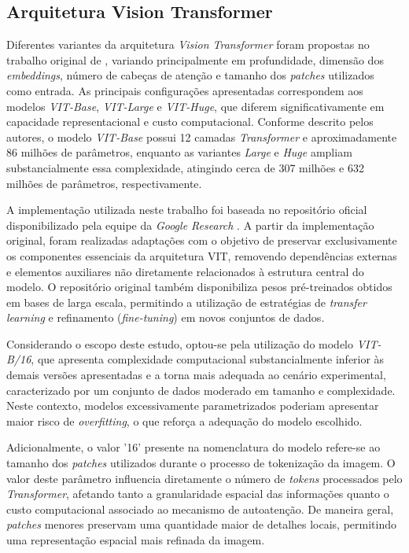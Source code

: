 \subsection{Arquitetura Vision Transformer}

Diferentes variantes da arquitetura \textit{Vision Transformer} foram propostas no trabalho original de \cite{dosovitskiy2020vit}, variando principalmente em profundidade, dimensão dos \textit{embeddings}, número de cabeças de atenção e tamanho dos \textit{patches} utilizados como entrada. As principais configurações apresentadas correspondem aos modelos \textit{\acs{VIT}-Base}, \textit{\acs{VIT}-Large} e \textit{\acs{VIT}-Huge}, que diferem significativamente em capacidade representacional e custo computacional. Conforme descrito pelos autores, o modelo \textit{\acs{VIT}-Base} possui 12 camadas \textit{Transformer} e aproximadamente 86 milhões de parâmetros, enquanto as variantes \textit{Large} e \textit{Huge} ampliam substancialmente essa complexidade, atingindo cerca de 307 milhões e 632 milhões de parâmetros, respectivamente.

A implementação utilizada neste trabalho foi baseada no repositório oficial disponibilizado pela equipe da \textit{Google Research} \cite{vision_transformer_google}. A partir da implementação original, foram realizadas adaptações com o objetivo de preservar exclusivamente os componentes essenciais da arquitetura \acs{VIT}, removendo dependências externas e elementos auxiliares não diretamente relacionados à estrutura central do modelo. O repositório original também disponibiliza pesos pré-treinados obtidos em bases de larga escala, permitindo a utilização de estratégias de \textit{transfer learning} e refinamento (\textit{fine-tuning}) em novos conjuntos de dados.

Considerando o escopo deste estudo, optou-se pela utilização do modelo \textit{\acs{VIT}-B/16}, que apresenta complexidade computacional substancialmente inferior às demais versões apresentadas e a torna mais adequada ao cenário experimental, caracterizado por um conjunto de dados moderado em tamanho e complexidade. Neste contexto, modelos excessivamente parametrizados poderiam apresentar maior risco de \textit{overfitting}, o que reforça a adequação do modelo escolhido. 

Adicionalmente, o valor '16' presente na nomenclatura do modelo refere-se ao tamanho dos \textit{patches} utilizados durante o processo de tokenização da imagem. O valor deste parâmetro influencia diretamente o número de \textit{tokens} processados pelo \textit{Transformer}, afetando tanto a granularidade espacial das informações quanto o custo computacional associado ao mecanismo de autoatenção. De maneira geral, \textit{patches} menores preservam uma quantidade maior de detalhes locais, permitindo uma representação espacial mais refinada da imagem.


